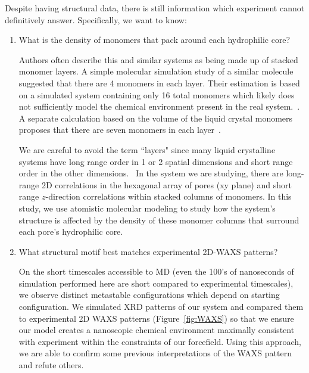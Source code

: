 \documentclass[journal=jpcbfk,manuscript=article]{achemso}
\begin{document}
 Despite having structural data, there is still information which experiment
 cannot definitively answer. Specifically, we want to know:
 \begin{enumerate}
    \item What is the density of monomers that pack around each hydrophilic core? 
    \label{point:monomernum}

 	Authors often describe this and similar systems as being made up of stacked monomer layers. A simple
 	molecular simulation study of a similar molecule suggested that there are 4 monomers
 	in each layer. Their estimation is based on a simulated system containing only 16 total
 	monomers which likely does not sufficiently model the chemical environment present in
 	the real system.~\cite{zhu_methacrylated_2006}. A separate calculation based on the 
 	volume of the liquid crystal monomers proposes that there are seven monomers in each 
 	layer~\cite{resel_structural_2000}. 

  	We are careful to avoid the term ``layers" since many liquid crystalline systems
 	have long range order in 1 or 2 spatial dimensions and short range order in 	
 	the other dimensions.~\cite{chaikin_principles_1995}  %
 	In the system we are studying, there are long-range 2D correlations in the 
 	hexagonal array of pores (xy plane) and short range $z$-direction correlations within 
        stacked columns of monomers. In this study, we use atomistic molecular modeling
        to study how the system's structure is affected by the density of these monomer columns
        that surround each pore's hydrophilic core. 

	\item What structural motif best matches experimental 2D-WAXS patterns?\label{point:xrdmatch}

	On the short timescales accessible to MD (even the 100's of nanoseconds of simulation 
	performed here are short compared to experimental timescales), we observe distinct metastable
	configurations which depend on starting configuration. We simulated XRD patterns of our system and 
	compared them to experimental 2D WAXS patterns (Figure~\ref{fig:WAXS}) so that we ensure our
	model creates a nanoscopic chemical environment maximally consistent with experiment within 
	the constraints	of our forcefield. Using this approach, we are able to confirm some previous
	interpretations	of the WAXS pattern and refute others. 
	


\end{enumerate}
\end{document}

